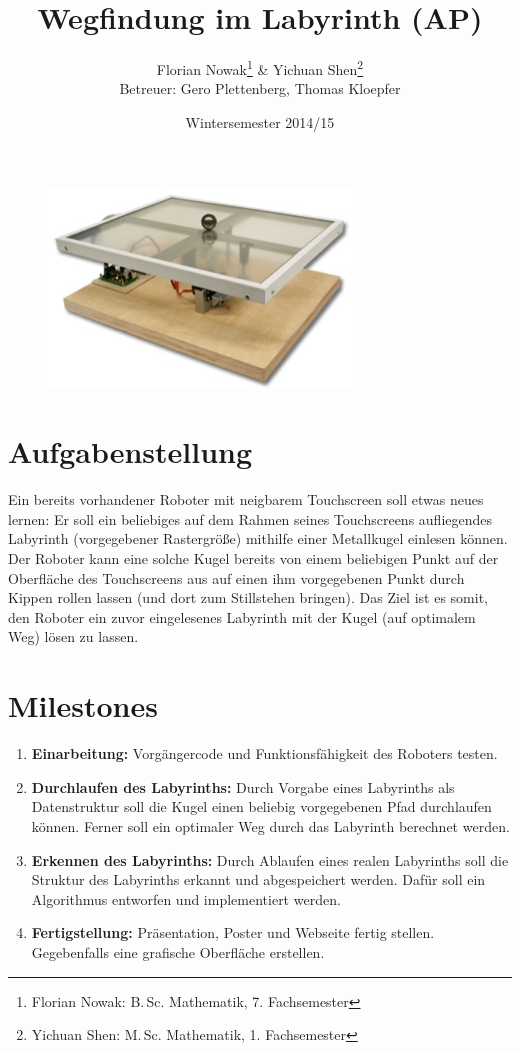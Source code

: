 \documentclass[ngerman]{scrartcl}
\title{Wegfindung im Labyrinth (AP)}
\author{
    Florian Nowak\footnote{Florian Nowak: B.\,Sc. Mathematik, 7. Fachsemester}\; \& Yichuan Shen\footnote{Yichuan Shen: M.\,Sc. Mathematik, 1. Fachsemester}\\
    Betreuer: Gero Plettenberg, Thomas Kloepfer
}
\date{Wintersemester 2014/15}
\begin{document}

\maketitle

\begin{figure}[h]
    \centering
    \includegraphics[scale=.5]{platzhalter}
\end{figure}

\section*{Aufgabenstellung}

Ein bereits vorhandener Roboter mit neigbarem Touchscreen soll etwas neues lernen: Er soll ein beliebiges auf dem Rahmen seines Touchscreens aufliegendes Labyrinth (vorgegebener Rastergröße) mithilfe einer Metallkugel einlesen können. Der Roboter kann eine solche Kugel bereits von einem beliebigen Punkt auf der Oberfläche des Touchscreens aus auf einen ihm vorgegebenen Punkt durch Kippen rollen lassen (und dort zum Stillstehen bringen). Das Ziel ist es somit, den Roboter ein zuvor eingelesenes Labyrinth mit der Kugel (auf optimalem Weg) lösen zu lassen.

\section*{Milestones}
\begin{enumerate}
    \item \textbf{Einarbeitung:} Vorgängercode und Funktionsfähigkeit des Roboters testen.
    \item \textbf{Durchlaufen des Labyrinths:} Durch Vorgabe eines Labyrinths als Datenstruktur soll die Kugel einen beliebig vorgegebenen Pfad durchlaufen können. Ferner soll ein optimaler Weg durch das Labyrinth berechnet werden.
    \item \textbf{Erkennen des Labyrinths:} Durch Ablaufen eines realen Labyrinths soll die Struktur des Labyrinths erkannt und abgespeichert werden. Dafür soll ein Algorithmus entworfen und implementiert werden.
    \item \textbf{Fertigstellung:} Präsentation, Poster und Webseite fertig stellen. Gegebenfalls eine grafische Oberfläche erstellen.
\end{enumerate}
\end{document}
